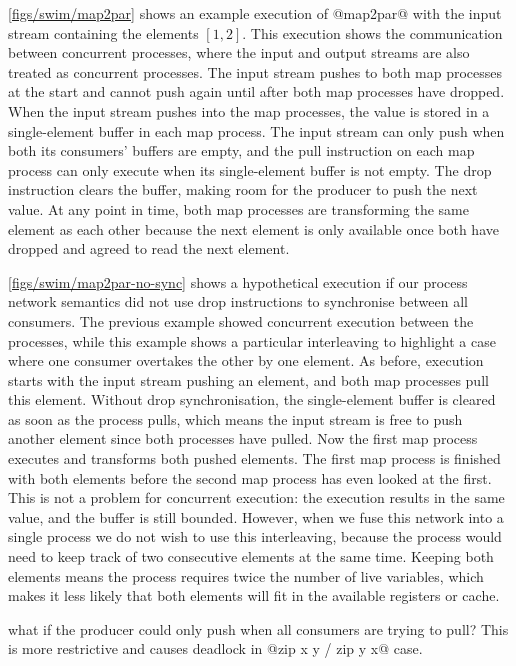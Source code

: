 \autoref{figs/swim/map2par} shows an example execution of @map2par@ with the input stream containing the elements $[1, 2]$.
This execution shows the communication between concurrent processes, where the input and output streams are also treated as concurrent processes.
The input stream pushes to both map processes at the start and cannot push again until after both map processes have dropped.
When the input stream pushes into the map processes, the value is stored in a single-element buffer in each map process.
The input stream can only push when both its consumers' buffers are empty, and the pull instruction on each map process can only execute when its single-element buffer is not empty.
The drop instruction clears the buffer, making room for the producer to push the next value.
At any point in time, both map processes are transforming the same element as each other because the next element is only available once both have dropped and agreed to read the next element.

\autoref{figs/swim/map2par-no-sync} shows a hypothetical execution if our process network semantics did not use drop instructions to synchronise between all consumers.
The previous example showed concurrent execution between the processes, while this example shows a particular interleaving to highlight a case where one consumer overtakes the other by one element.
As before, execution starts with the input stream pushing an element, and both map processes pull this element.
Without drop synchronisation, the single-element buffer is cleared as soon as the process pulls, which means the input stream is free to push another element since both processes have pulled.
Now the first map process executes and transforms both pushed elements.
The first map process is finished with both elements before the second map process has even looked at the first.
This is not a problem for concurrent execution: the execution results in the same value, and the buffer is still bounded.
However, when we fuse this network into a single process we do not wish to use this interleaving, because the process would need to keep track of two consecutive elements at the same time.
Keeping both elements means the process requires twice the number of live variables, which makes it less likely that both elements will fit in the available registers or cache.

 what if the producer could only push when all consumers are trying to pull?
This is more restrictive and causes deadlock in @zip x y / zip y x@ case.

